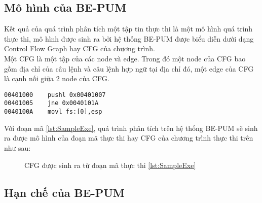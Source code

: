 \subsection{Mô hình của BE-PUM}
\hspace{0.5cm}Kết quả của quá trình phân tích một tập tin thực thi là một mô hình quá trình thực thi, mô hình được sinh ra bởi hệ thống BE-PUM được biểu diễn dưới dạng Control Flow Graph hay CFG của chương trình.\\

\hspace{0.5cm}Một CFG là một tập của các node và edge. Trong đó một node của CFG bao gồm địa chỉ của câu lệnh và câu lệnh hợp ngữ tại địa chỉ đó, một edge của CFG là cạnh nối giữa 2 node của CFG.

\begin{code}
\begin{lstlisting}[captionpos=b,caption={Ví dụ về một đoạn mã thực thi},label={lst:SampleExe},frame=single]
00401000	pushl 0x00401007
00401005	jne 0x0040101A
0040100A 	movl fs:[0],esp			
\end{lstlisting}
\end{code}

\hspace{0.5cm}Với đoạn mã \ref {lst:SampleExe}, quá trình phân tích trên hệ thống BE-PUM sẽ sinh ra được mô hình của đoạn mã thực thi hay CFG của chương trình thực thi trên như sau:

\begin{figure}
\centering
{}
\label{fig:SampleCFG}
\caption{CFG được sinh ra từ đoạn mã thực thi \ref {lst:SampleExe}}
\end{figure}

\subsection{Hạn chế của BE-PUM}

